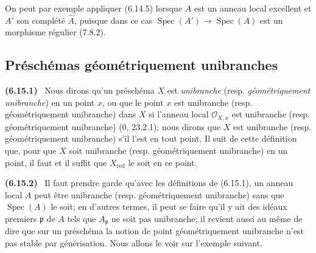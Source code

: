 \documentclass[10pt,oneside]{book}
\makeatletter
\newenvironment{env}[1][]{\par\medskip\noindent\textbf{(#1)}\ }{\par}
\newcommand{\EGAReaderTarget}[2]{\hypertarget{#1}{}\@bsphack\begingroup\def\@currentHref{#1}\label{#2}\endgroup\@esphack}
\makeatother
\begin{document}
On peut par exemple appliquer (6.14.5) lorsque $A$ est un anneau local
excellent et $A'$ son complété $\widehat A$, puisque dans ce cas
$\operatorname{Spec}(A')\to\operatorname{Spec}(A)$ est un morphisme
régulier (7.8.2).

\subsection{Préschémas géométriquement unibranches}
\label{IV.2.s6.15-fr}

\begin{env}[6.15.1]
\label{IV.2.s6.15.1-fr}
Nous dirons qu'un préschéma $X$ est \emph{unibranche} (resp.
\emph{géométriquement unibranche}) en un point $x$, ou que le point $x$
est unibranche (resp. géométriquement unibranche) dans $X$ si l'anneau
local $\mathcal O_{X,x}$ est unibranche (resp. géométriquement
unibranche) (0, 23.2.1); nous dirons que $X$ est unibranche (resp.
géométriquement unibranche) s'il l'est en tout point. Il suit de cette
définition que, pour que $X$ soit unibranche (resp. géométriquement
unibranche) en un point, il faut et il suffit que $X_{\mathrm{red}}$ le soit
en ce point.
\end{env}

\begin{env}[6.15.2]
\EGAReaderTarget{ega4.c04.statement.6-15-2}{IV.2.s6.15.2-fr}
Il faut prendre garde qu'avec les définitions de (6.15.1), un anneau local
$A$ peut être unibranche (resp. géométriquement unibranche) sans que
$\operatorname{Spec}(A)$ le soit; en d'autres termes, il peut se faire qu'il
y ait des idéaux premiers $\mathfrak p$ de $A$ tels que $A_\mathfrak p$ ne
soit pas unibranche; il revient aussi au même de dire que sur un préschéma
la notion de point géométriquement unibranche n'est pas stable par
générisation. Nous allons le voir sur l'exemple suivant.
\end{env}
\end{document}
